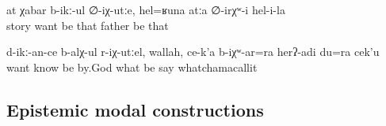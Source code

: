 \begin{exe}
	\ex	\label{ex:‎If you want stories, (here is one), she had such a father (and these were the stories about him)}
	\gll	at	χabar	b-ikː-ul	∅-iχ-utːe,	hel=ʁuna	atːa	∅-irχʷ-i	hel-i-la\\
			story	want	be	that	father	be	that\\
	\glt	{}

	\ex	\label{ex:‎If I would have known what you want, by God, I would also have said something}
	\gll	d-ikː-an-ce	b-alχ-ul	r-iχ-utːel,	wallah,	ce-k'a	b-iχʷ-ar=ra	herʔ-adi		du=ra	cek'u\\
		want	know	be	by.God	what	be	say		whatchamacallit\\
	\glt	{}
\end{exe}



\subsection{Epistemic modal constructions}\label{ssec:Epistemic modal constructions}
\largerpage

